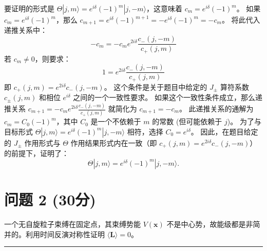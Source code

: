 \documentclass{article}
\begin{document}
要证明的形式是 \(\Theta|j, m\rangle = e^{i\delta} (-1)^m |j, -m\rangle\)，这意味着 \(c_m = e^{i\delta} (-1)^m\)。
如果 \(c_m = e^{i\delta} (-1)^m\)，那么 \(c_{m+1} = e^{i\delta} (-1)^{m+1} = -e^{i\delta} (-1)^m = -c_m\)。
将此代入递推关系中：
\[ -c_m = -c_m e^{2i\delta} \frac{c_-(j, -m)}{c_+(j, m)} \]
若 \(c_m \neq 0\)，则要求：
\[ 1 = e^{2i\delta} \frac{c_-(j, -m)}{c_+(j, m)} \]
即 \(c_+(j, m) = e^{2i\delta} c_-(j, -m)\)。
这个条件是关于题目中给定的 \(J_\pm\) 算符系数 \(c_\pm(j,m)\) 和相位 \(e^{i\delta}\) 之间的一个一致性要求。
如果这个一致性条件成立，那么递推关系 \(c_{m+1} = -c_m e^{2i\delta} \frac{c_-(j, -m)}{c_+(j, m)}\) 就简化为 \(c_{m+1} = -c_m\)。
此递推关系的通解为 \(c_m = C_0 (-1)^m\)，其中 \(C_0\) 是一个不依赖于 \(m\) 的常数 (但可能依赖于 \(j\))。
为了与目标形式 \(\Theta|j, m\rangle = e^{i\delta} (-1)^m |j, -m\rangle\) 相符，选择 \(C_0 = e^{i\delta}\)。
因此，在题目给定的 \(J_\pm\) 作用形式与 \(\Theta\) 作用结果形式内在一致（即 \(c_+(j, m) = e^{2i\delta} c_-(j, -m)\)）的前提下，证明了：
\[ \Theta|j, m\rangle = e^{i\delta} (-1)^m |j, -m\rangle. \]
\newpage
\section*{问题 2 (30分)}
\noindent 一个无自旋粒子束缚在固定点，其束缚势能 \(V(\mathbf{x})\) 不是中心势，故能级都是非简并的。利用时间反演对称性证明 \(\langle \mathbf{L} \rangle = 0\)。

\rule[1ex]{\textwidth}{0.4pt}
\end{document}
